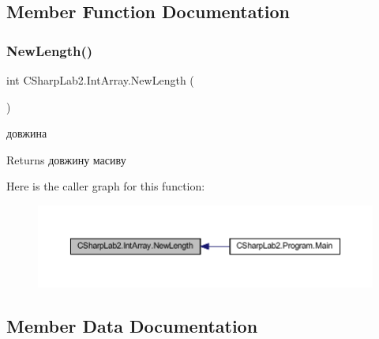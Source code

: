 \subsection{Member Function Documentation}
\hypertarget{class_c_sharp_lab2_1_1_int_array_abe62d3588deef8d7e98ed5b3fd18e6fb}{}\label{class_c_sharp_lab2_1_1_int_array_abe62d3588deef8d7e98ed5b3fd18e6fb} 
\subsubsection{\texorpdfstring{New\+Length()}{NewLength()}}
{\footnotesize\ttfamily int C\+Sharp\+Lab2.\+Int\+Array.\+New\+Length (\begin{DoxyParamCaption}{ }\end{DoxyParamCaption})\hspace{0.3cm}{\ttfamily [inline]}}



довжина 

\begin{DoxyReturn}{Returns}
довжину масиву
\end{DoxyReturn}
Here is the caller graph for this function\+:
\nopagebreak
\begin{figure}[H]
\begin{center}
\leavevmode
\includegraphics[width=350pt]{class_c_sharp_lab2_1_1_int_array_abe62d3588deef8d7e98ed5b3fd18e6fb_icgraph}
\end{center}
\end{figure}


\subsection{Member Data Documentation}
\hypertarget{class_c_sharp_lab2_1_1_int_array_adfe65a25352fc485dfd771e03c9b9362}{}\label{class_c_sharp_lab2_1_1_int_array_adfe65a25352fc485dfd771e03c9b9362} 
